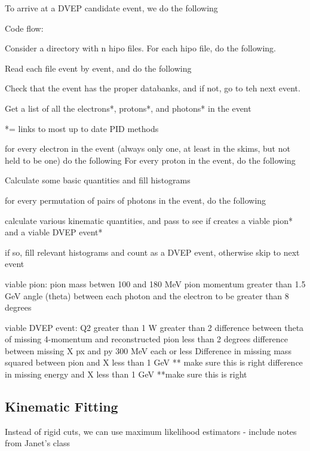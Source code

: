     
    
    
    
    
    
    To arrive at a DVEP candidate event, we do the following
    
    
    Code flow:
    
    Consider a directory with n hipo files. For each hipo file, do the following.
    
    Read each file event by event, and do the following
    
    Check that the event has the proper databanks, and if not, go to teh next event.
    
    Get a list of all the electrons*, protons*, and photons* in the event
    
    *= links to most up to date PID methods
    
    for every electron in the event (always only one, at least in the skims, but not held to be one) do the following
    For every proton in the event, do the following
    
    Calculate some basic quantities and fill histograms
    
    for every permutation of pairs of photons in the event, do the following
    
    calculate various kinematic quantities, and pass to see if creates a viable pion* and a viable DVEP event*
    
    if so, fill relevant histograms and count as a DVEP event, otherwise skip to next event
    
    viable pion: 
    pion mass betwen 100 and 180 MeV
    pion momentum greater than 1.5 GeV
    angle (theta) between each photon and the electron to be greater than 8 degrees
    
    viable DVEP event:
    Q2 greater than 1
    W greater than 2
    difference between theta of missing 4-momentum and reconstructed pion less than 2 degrees
    difference between missing X px and py 300 MeV each or less
    Difference in missing mass squared between pion and X less than 1 GeV ** make sure this is right
    difference in missing energy and X less than 1 GeV **make sure this is right
    
    

\subsection{Kinematic Fitting}

    Instead of rigid cuts, we can use maximum likelihood estimators - include notes from Janet's class